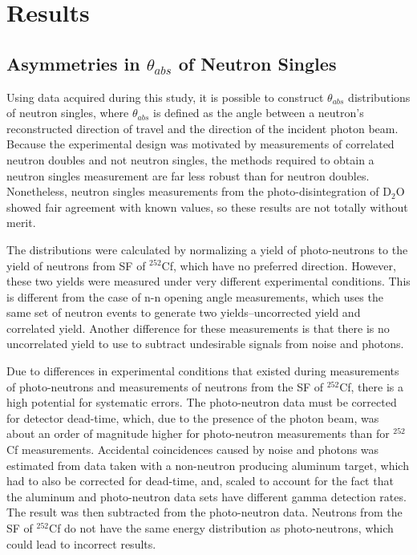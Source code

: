 \chapter{Results}
\thispagestyle{fancy}


\section{Asymmetries in $\theta_{abs}$ of Neutron Singles}
Using data acquired during this study, it is possible to construct $\theta_{abs}$ distributions of neutron singles, where $\theta_{abs}$ is defined as the angle between a neutron's reconstructed direction of travel and the direction of the incident photon beam.
Because the experimental design was motivated by measurements of correlated neutron doubles and not neutron singles, the methods required to obtain a neutron singles measurement are far less robust than for neutron doubles.
Nonetheless, neutron singles measurements from the photo-disintegration of D$_{2}$O showed fair agreement with known values, so these results are not totally without merit.

The distributions were calculated by normalizing a yield of photo-neutrons to the yield of neutrons from SF of $^{252}$Cf, which have no preferred direction.
However, these two yields were measured under very different experimental conditions.
This is different from the case of n-n opening angle measurements, which uses the same set of neutron events to generate two yields--uncorrected yield and correlated yield.
Another difference for these measurements is that there is no uncorrelated yield to use to subtract undesirable signals from noise and photons.

 Due to differences in experimental conditions that existed during measurements of photo-neutrons and measurements of neutrons from the SF of $^{252}$Cf, there is a high potential for systematic errors.
The photo-neutron data must be corrected for detector dead-time, which, due to the presence of the photon beam, was about an order of magnitude higher for photo-neutron measurements than for $^{252}$Cf measurements.
Accidental coincidences caused by noise and photons was estimated from data taken with a non-neutron producing aluminum target, which had to also be corrected for dead-time, and, scaled to account for the fact that the aluminum and photo-neutron data sets have different gamma detection rates.
The result was then subtracted from the photo-neutron data.
Neutrons from the SF of $^{252}$Cf do not have the same energy distribution as photo-neutrons, which could lead to incorrect results.

